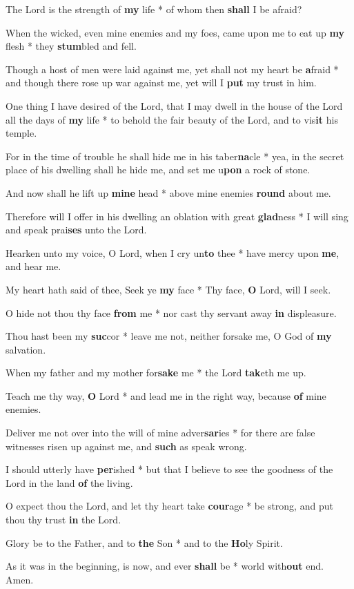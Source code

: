 \begin{multicols}{2}
	The Lord is the strength of \textbf{my} life * of whom then \textbf{shall} I be afraid?
	
	When the wicked, even mine enemies and my foes, came upon me to eat up \textbf{my} flesh * they \textbf{stum}bled and fell.
	
	Though a host of men were laid against me, yet shall not my heart be \textbf{a}fraid * and though there rose up war against me, yet will I \textbf{put} my trust in him.
	
	One thing I have desired of the Lord, that I may dwell in the house of the Lord all the days of \textbf{my} life * to behold the fair beauty of the Lord, and to vis\textbf{it} his temple.
	
	For in the time of trouble he shall hide me in his taber\textbf{na}cle * yea, in the secret place of his dwelling shall he hide me, and set me u\textbf{pon} a rock of stone.
	
	And now shall he lift up \textbf{mine} head * above mine enemies \textbf{round} about me.
	
	Therefore will I offer in his dwelling an oblation with great \textbf{glad}ness * I will sing and speak prai\textbf{ses} unto the Lord.
	
	Hearken unto my voice, O Lord, when I cry un\textbf{to} thee * have mercy upon \textbf{me}, and hear me.
	
	My heart hath said of thee, Seek ye \textbf{my} face * Thy face, \textbf{O} Lord, will I seek.
	
	O hide not thou thy face \textbf{from} me * nor cast thy servant away \textbf{in} displeasure.
	
	Thou hast been my \textbf{suc}cor * leave me not, neither forsake me, O God of \textbf{my} salvation.
	
	When my father and my mother for\textbf{sake} me * the Lord \textbf{tak}eth me up.
	
	Teach me thy way, \textbf{O} Lord * and lead me in the right way, because \textbf{of} mine enemies.
	
	Deliver me not over into the will of mine adver\textbf{sar}ies * for there are false witnesses risen up against me, and \textbf{such} as speak wrong.
	
	I should utterly have \textbf{per}ished * but that I believe  to see the goodness of the Lord in the land \textbf{of} the living.
	
	O expect thou the Lord, and let thy heart take \textbf{cour}age * be strong, and put thou thy trust \textbf{in} the Lord.
	
	Glory be to the Father, and to \textbf{the} Son * and to the \textbf{Ho}ly Spirit.
	
	As it was in the beginning, is now, and ever \textbf{shall} be * world with\textbf{out} end. Amen.
\end{multicols}